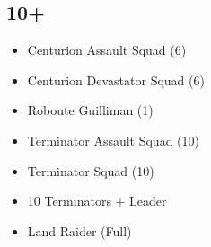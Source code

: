 \documentclass{HordeModeTarot}
\begin{document}
\begin{multicols}{2}
\subsection*{10+}

\begin{itemize}[leftmargin=*]
\item[] Centurion Assault Squad (6)
\item[] Centurion Devastator Squad (6)
\item[] Roboute Guilliman (1)
\item[] Terminator Assault Squad (10)
\item[] Terminator Squad (10)
\item[] 10 Terminators + Leader
\item[] Land Raider (Full)
\end{itemize}


\end{multicols}
\end{document}
